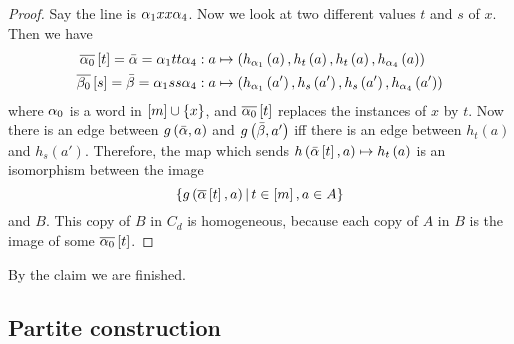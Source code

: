 \documentclass{amsart}
\begin{document}
\begin{Proof}
\begin{proof}
Say the line is $\alpha_1 xx \alpha_4$. Now we look at two different values $t$ and $s$ of $x$.
Then we have
\begin{align}
\overline{\alpha_0}\left[ t \right] = \bar{\alpha} = \alpha_1 tt \alpha_4: a&\mapsto
\left( h_{\alpha_1}\left( a \right) , h_t\left( a \right) , h_t\left( a \right) ,
h_{\alpha_4}\left( a \right) \right)
\\
\overline{\beta_0}\left[ s \right] = \bar{\beta} = \alpha_1 ss \alpha_4: a&\mapsto
\left( h_{\alpha_1}\left( a' \right) , h_s\left( a' \right) , h_s\left( a' \right) ,
h_{\alpha_4}\left( a' \right) \right) 
\end{align}
where $\alpha_0$ is a word in $\left[ m \right]\cup \left\{ x \right\}$,
and $\overline{\alpha_0}\left[ t \right]$ replaces the instances of $x$ by $t$.
Now there is an edge between $g\left( \bar{\alpha} , a \right)$ and $g\left( \bar{\beta} ,
a'\right)$ iff there is an edge between $h_t\left( a \right)$ and $h_s\left( a'
\right)$. 
Therefore, the map which sends $h\left( \bar{\alpha}\left[ t \right] , a \right)\mapsto h_t\left(
a \right)$ is an isomorphism between the image
\begin{equation}
\left\{ g\left( \overline{\alpha}\left[ t \right] , a \right)\, \middle\vert \, t\in \left[ m \right] , a\in A
\right\}
\end{equation}
and $B$. This copy of $B$ in $C_d$ is homogeneous, because each copy of $A$ in $B$
is the image of some $\overline{\alpha_0}\left[ t \right]$.
\end{proof}
By the claim we are finished.
\end{Proof}

\subsection{Partite construction}
\end{document}
